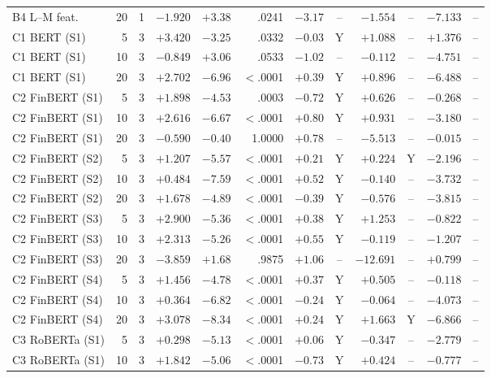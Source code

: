 \begin{table}[p]
\begin{tabular}{@{}lrrrrrrcrcrc@{}}
B4 L--M feat.      & 20 & 1 & $-1.920$ & $+3.38$ & .0241 & $-3.17$ & -- & $-1.554$ & -- & $-7.133$ & -- \\
C1 BERT (S1)       &  5 & 3 & $+3.420$ & $-3.25$ & .0332 & $-0.03$ & Y & $+1.088$ & -- & $+1.376$ & -- \\
C1 BERT (S1)       & 10 & 3 & $-0.849$ & $+3.06$ & .0533 & $-1.02$ & -- & $-0.112$ & -- & $-4.751$ & -- \\
C1 BERT (S1)       & 20 & 3 & $+2.702$ & $-6.96$ & $<$.0001 & $+0.39$ & Y & $+0.896$ & -- & $-6.488$ & -- \\
C2 FinBERT (S1)    &  5 & 3 & $+1.898$ & $-4.53$ & .0003 & $-0.72$ & Y & $+0.626$ & -- & $-0.268$ & -- \\
C2 FinBERT (S1)    & 10 & 3 & $+2.616$ & $-6.67$ & $<$.0001 & $+0.80$ & Y & $+0.931$ & -- & $-3.180$ & -- \\
C2 FinBERT (S1)    & 20 & 3 & $-0.590$ & $-0.40$ & 1.0000 & $+0.78$ & -- & $-5.513$ & -- & $-0.015$ & -- \\
C2 FinBERT (S2)    &  5 & 3 & $+1.207$ & $-5.57$ & $<$.0001 & $+0.21$ & Y & $+0.224$ & Y & $-2.196$ & -- \\
C2 FinBERT (S2)    & 10 & 3 & $+0.484$ & $-7.59$ & $<$.0001 & $+0.52$ & Y & $-0.140$ & -- & $-3.732$ & -- \\
C2 FinBERT (S2)    & 20 & 3 & $+1.678$ & $-4.89$ & $<$.0001 & $-0.39$ & Y & $-0.576$ & -- & $-3.815$ & -- \\
C2 FinBERT (S3)    &  5 & 3 & $+2.900$ & $-5.36$ & $<$.0001 & $+0.38$ & Y & $+1.253$ & -- & $-0.822$ & -- \\
C2 FinBERT (S3)    & 10 & 3 & $+2.313$ & $-5.26$ & $<$.0001 & $+0.55$ & Y & $-0.119$ & -- & $-1.207$ & -- \\
C2 FinBERT (S3)    & 20 & 3 & $-3.859$ & $+1.68$ & .9875 & $+1.06$ & -- & $-12.691$ & -- & $+0.799$ & -- \\
C2 FinBERT (S4)    &  5 & 3 & $+1.456$ & $-4.78$ & $<$.0001 & $+0.37$ & Y & $+0.505$ & -- & $-0.118$ & -- \\
C2 FinBERT (S4)    & 10 & 3 & $+0.364$ & $-6.82$ & $<$.0001 & $-0.24$ & Y & $-0.064$ & -- & $-4.073$ & -- \\
C2 FinBERT (S4)    & 20 & 3 & $+3.078$ & $-8.34$ & $<$.0001 & $+0.24$ & Y & $+1.663$ & Y & $-6.866$ & -- \\
C3 RoBERTa (S1)    &  5 & 3 & $+0.298$ & $-5.13$ & $<$.0001 & $+0.06$ & Y & $-0.347$ & -- & $-2.779$ & -- \\
C3 RoBERTa (S1)    & 10 & 3 & $+1.842$ & $-5.06$ & $<$.0001 & $-0.73$ & Y & $+0.424$ & -- & $-0.777$ & -- \\

\end{tabular}
\end{table}
